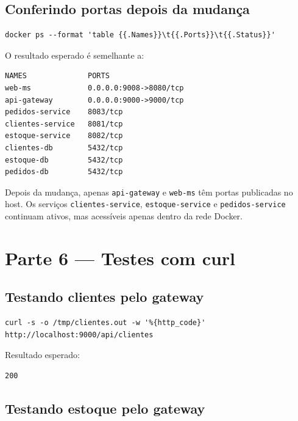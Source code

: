 \documentclass[12pt,a4paper]{article}
\begin{document}
\subsection{Conferindo portas depois da mudan\c{c}a}

\begin{lstlisting}[style=terminal]
docker ps --format 'table {{.Names}}\t{{.Ports}}\t{{.Status}}'
\end{lstlisting}

O resultado esperado \'e semelhante a:

\begin{lstlisting}[style=terminal]
NAMES              PORTS
web-ms             0.0.0.0:9008->8080/tcp
api-gateway        0.0.0.0:9000->9000/tcp
pedidos-service    8083/tcp
clientes-service   8081/tcp
estoque-service    8082/tcp
clientes-db        5432/tcp
estoque-db         5432/tcp
pedidos-db         5432/tcp
\end{lstlisting}

\begin{infobox}
  Depois da mudan\c{c}a, apenas \texttt{api-gateway} e \texttt{web-ms} t\^em portas publicadas no host. Os servi\c{c}os \texttt{clientes-service}, \texttt{estoque-service} e \texttt{pedidos-service} continuam ativos, mas acess\'iveis apenas dentro da rede Docker.
\end{infobox}

\section{Parte 6 --- Testes com curl}

\subsection{Testando clientes pelo gateway}

\begin{lstlisting}[style=terminal]
curl -s -o /tmp/clientes.out -w '%{http_code}' http://localhost:9000/api/clientes
\end{lstlisting}

Resultado esperado:

\begin{lstlisting}[style=terminal]
200
\end{lstlisting}

\subsection{Testando estoque pelo gateway}
\end{document}
